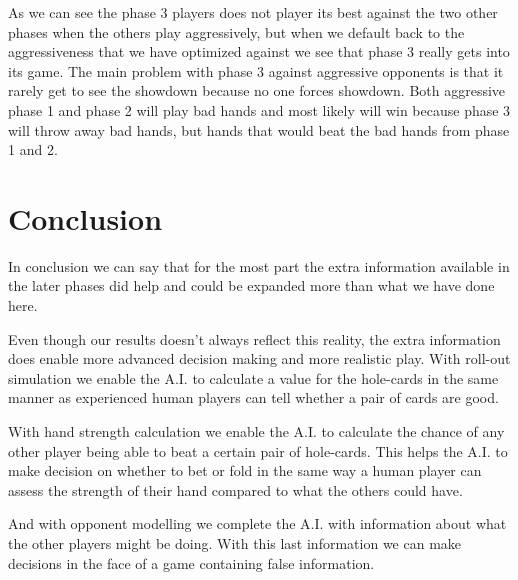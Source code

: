 \documentclass[titlepage, a4paper]{article}
\begin{document}
As we can see the phase 3 players does not player its best against the two other
phases when the others play aggressively, but when we default back to the aggressiveness
that we have optimized against we see that phase 3 really gets into its game. The main
problem with phase 3 against aggressive opponents is that it rarely get to
see the showdown because no one forces showdown. Both aggressive phase 1 and phase 2
will play bad hands and most likely will win because phase 3 will throw away
bad hands, but hands that would beat the bad hands from phase 1 and 2.

\section{Conclusion}\label{conclusion}
In conclusion we can say that for the most part the extra information available
in the later phases did help and could be expanded more than what we have done
here.

Even though our results doesn't always reflect this reality, the extra information does
enable more advanced decision making and more realistic play. With roll-out simulation
we enable the A.I. to calculate a value for the hole-cards in the same manner as 
experienced human players can tell whether a pair of cards are good.

With hand strength calculation we enable the A.I. to calculate the chance of any
other player being able to beat a certain pair of hole-cards. This helps the A.I.
to make decision on whether to bet or fold in the same way a human player can assess
the strength of their hand compared to what the others could have.

And with opponent modelling we complete the A.I. with information about what
the other players might be doing. With this last information we can make decisions
in the face of a game containing false information.

\end{document}
